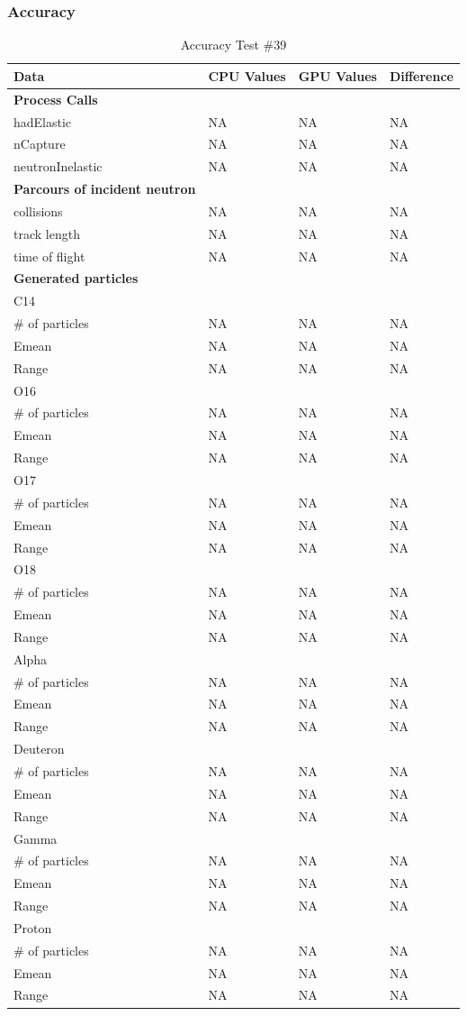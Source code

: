 \documentclass[12pt]{article}
\begin{document}
	\subsubsection{Accuracy}
		\begin{table}[!htbp]
		\centering
		\caption{Accuracy Test \#39}\label{_acc}
		\begin{tabular}{llll}
		\toprule
		\bf Data & CPU Values & GPU Values & Difference\\\midrule
		\bf Process Calls&&&\\
		hadElastic&NA&NA&NA\\
		nCapture&NA&NA&NA\\
		neutronInelastic&NA&NA&NA\\ 
		\bf Parcours of incident neutron&&&\\
		collisions&NA&NA&NA\\
		track length&NA&NA&NA\\
		time of flight&NA&NA&NA\\
		\bf Generated particles&&&\\
		C14&&&\\
		\# of particles&NA&NA&NA\\
		Emean&NA&NA&NA\\
		Range&NA&NA&NA\\
		O16&&&\\
		\# of particles&NA&NA&NA\\
		Emean&NA&NA&NA\\
		Range&NA&NA&NA\\
		O17&&&\\
		\# of particles&NA&NA&NA\\
		Emean&NA&NA&NA\\
		Range&NA&NA&NA\\
		O18&&&\\
		\# of particles&NA&NA&NA\\
		Emean&NA&NA&NA\\
		Range&NA&NA&NA\\
		Alpha&&&\\
		\# of particles&NA&NA&NA\\
		Emean&NA&NA&NA\\
		Range&NA&NA&NA\\
		Deuteron&&&\\
		\# of particles&NA&NA&NA\\
		Emean&NA&NA&NA\\
		Range&NA&NA&NA\\
		Gamma&&&\\
		\# of particles&NA&NA&NA\\
		Emean&NA&NA&NA\\
		Range&NA&NA&NA\\
		Proton&&&\\
		\# of particles&NA&NA&NA\\
		Emean&NA&NA&NA\\
		Range&NA&NA&NA\\
		\end{tabular}
		\end{table}
		\break
\end{document}
